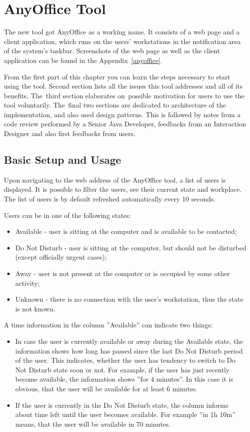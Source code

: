 \documentclass[11pt,singleside]{myfithesis2}
\begin{document}
\chapter{AnyOffice Tool}

The new tool got AnyOffice as a working name. It consists of a web page and a client application, which runs on the users' workstations in the notification area of the system's taskbar. Screenshots of the web page as well as the client application can be found in the Appendix~\ref{anyoffice}.

From the first part of this chapter you can learn the steps necessary to start using the tool. Second section lists all the issues this tool addresses and all of its benefits. The~third section elaborates on~possible motivation for users to use the tool voluntarily. The~final two sections are dedicated to architecture of the implementation, and also used design patterns. This is followed by notes from a code review performed by a Senior Java Developer, feedbacks from an Interaction Designer and also first feedbacks from users.


	\section{Basic Setup and Usage}
Upon navigating to the web address of the AnyOffice tool, a list of users is displayed. It is possible to filter the users, see their current state and workplace. The list of users is by default refreshed automatically every 10 seconds.

Users can be in one of the following states:
\begin{itemize}
	\item Available - user is sitting at the computer and is available to be contacted;
	\item Do Not Disturb - user is sitting at the computer, but should not be disturbed (except officially urgent cases);
	\item Away - user is not present at the computer or is occupied by some other activity;
	\item Unknown - there is no connection with the user's workstation, thus the state is not known.
\end{itemize}

A time information in the column ''Available'' can indicate two things:
\begin{itemize}
	\item In case the user is currently available or away during the Available state, the information shows how long has passed since the last Do Not Disturb period of the user. This indicates, whether the user has tendency to switch to Do Not Disturb state soon or not. For example, if the user has just recently become available, the information shows ''for 4 minutes''. In this case it is obvious, that the user will be available for at least 6 minutes.
	\item If the user is currently in the Do Not Disturb state, the column informs about time left until the user becomes available. For example ''in 1h 10m'' means, that the user will be available in 70 minutes.
\end{itemize}
\end{document}
